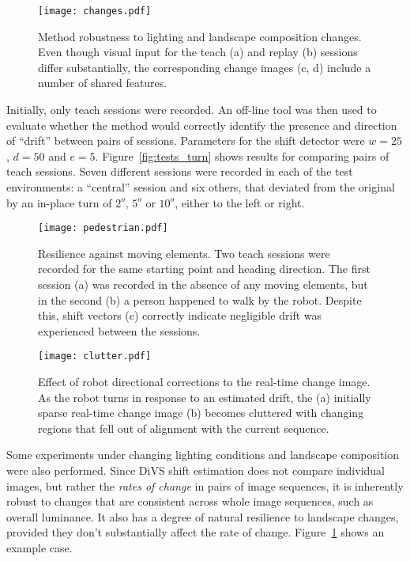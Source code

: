 \documentclass[twocolumn, 9pt,fleqn]{jsproceedings}
\begin{document}
\begin{figure}[h!]
\centering
\texttt{[image: changes.pdf]}
\caption{Method robustness to lighting and landscape composition changes. Even though visual input for the teach (a) and replay (b) sessions differ substantially, the corresponding change images (c, d) include a number of shared features.}
\label{fig:changes}
\end{figure}

Initially, only teach sessions were recorded. An off-line tool was then used to evaluate whether the method would correctly identify the presence and direction of ``drift'' between pairs of sessions. Parameters for the shift detector were $w = 25$, $d = 50$ and $e = 5$. Figure~\ref{fig:tests_turn} shows results for comparing pairs of teach sessions. Seven different sessions were recorded in each of the test environments: a ``central'' session and six others, that deviated from the original by an in-place turn of $2^o$, $5^o$ or $10^o$, either to the left or right.

\begin{figure}[h!]
\texttt{[image: pedestrian.pdf]}
\caption{Resilience against moving elements. Two teach sessions were recorded for the same starting point and heading direction. The first session (a) was recorded in the absence of any moving elements, but in the second (b) a person happened to walk by the robot. Despite this, shift vectors (c) correctly indicate negligible drift was experienced between the sessions.}
\label{fig:pedestrian}
\end{figure}

\begin{figure}[h!]
\centering
\texttt{[image: clutter.pdf]}
\caption{Effect of robot directional corrections to the real-time change image. As the robot turns in response to an estimated drift, the (a) initially sparse real-time change image (b) becomes cluttered with changing regions that fell out of alignment with the current sequence.}
\label{fig:clutter}
\end{figure}

Some experiments under changing lighting conditions and landscape composition were also performed. Since DiVS shift estimation does not compare individual images, but rather the {\it rates of change} in pairs of image sequences, it is inherently robust to changes that are consistent across whole image sequences, such as overall luminance. It also has a degree of natural resilience to landscape changes, provided they don't substantially affect the rate of change. Figure~\ref{fig:changes} shows an example case.
\end{document}
